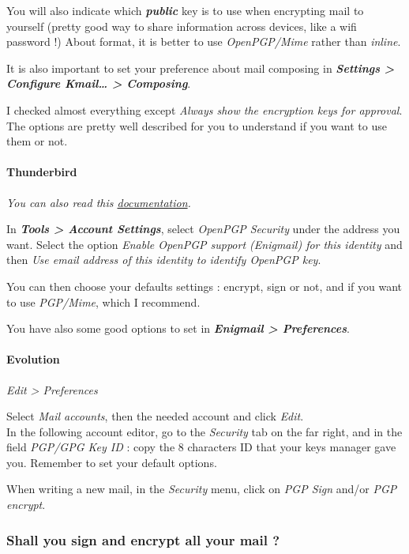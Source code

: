 You will also indicate which \textbf{\emph{public}} key is to use when
encrypting mail to yourself (pretty good way to share information across
devices, like a wifi password !) About format, it is better to use
\emph{OpenPGP/Mime} rather than \emph{inline}.

It is also important to set your preference about mail composing in
\textbf{\emph{Settings \textgreater{} Configure Kmail\ldots{}
\textgreater{} Composing}}.

I checked almost everything except \emph{Always show the encryption keys
for approval}. The options are pretty well described for you to
understand if you want to use them or not.

\paragraph{Thunderbird}\label{thunderbird}

\emph{You can also read this
\href{https://support.mozilla.org/en-US/kb/digitally-signing-and-encrypting-messages}{documentation}.}

In \textbf{\emph{Tools \textgreater{} Account Settings}}, select
\emph{OpenPGP Security} under the address you want. Select the option
\emph{Enable OpenPGP support (Enigmail) for this identity} and then
\emph{Use email address of this identity to identify OpenPGP key}.

You can then choose your defaults settings : encrypt, sign or not, and
if you want to use \emph{PGP/Mime}, which I recommend.

You have also some good options to set in \textbf{\emph{Enigmail
\textgreater{} Preferences}}.

\paragraph{Evolution}\label{evolution}

\emph{Edit \textgreater{} Preferences}

Select \emph{Mail accounts}, then the needed account and click
\emph{Edit}.\\In the following account editor, go to the \emph{Security}
tab on the far right, and in the field \emph{PGP/GPG Key ID} : copy the
8 characters ID that your keys manager gave you. Remember to set your
default options.

When writing a new mail, in the \emph{Security} menu, click on \emph{PGP
Sign} and/or \emph{PGP encrypt}.

\subsubsection{Shall you sign and encrypt all your mail ?}\label{shall-you-sign-and-encrypt-all-your-mail}

